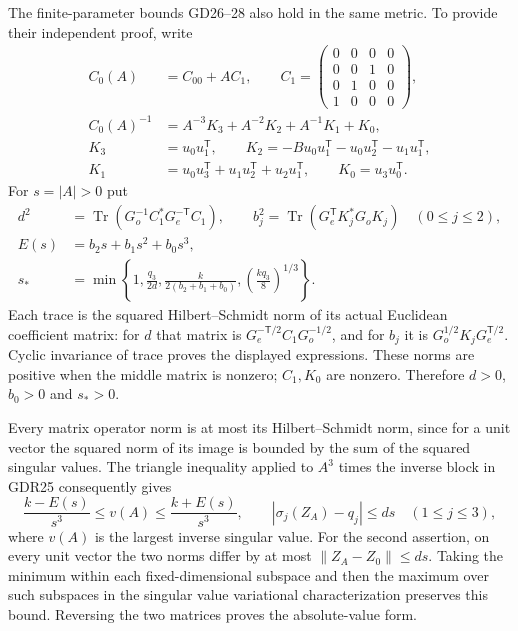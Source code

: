 \documentclass[11pt]{article}
\providecommand{\Tr}{\operatorname{Tr}}
\providecommand{\Tr}{\operatorname{Tr}}
\begin{document}
The finite-parameter bounds GD26--28 also hold in the same
metric. To provide their independent proof, write
\begin{equation}
 \begin{aligned}
 C_0(A)&=C_{00}+AC_1,\qquad
 C_1=\begin{pmatrix}0&0&0&0\\0&0&1&0\\0&1&0&0\\1&0&0&0\end{pmatrix},\\
 C_0(A)^{-1}&=A^{-3}K_3+A^{-2}K_2+A^{-1}K_1+K_0,\\
 K_3&=u_0u_1^{\mathsf T},\qquad
 K_2=-Bu_0u_1^{\mathsf T}-u_0u_2^{\mathsf T}-u_1u_1^{\mathsf T},\\
 K_1&=u_0u_3^{\mathsf T}+u_1u_2^{\mathsf T}+u_2u_1^{\mathsf T},
 \qquad K_0=u_3u_0^{\mathsf T}.
 \end{aligned}
 \tag{GDR28}
\end{equation}
For $s=|A|>0$ put
\begin{equation}
 \begin{aligned}
 d^2&=\Tr(G_o^{-1}C_1^*G_e^{-\mathsf T}C_1),\qquad
 b_j^2=\Tr(G_e^{\mathsf T}K_j^*G_oK_j)\quad(0\le j\le2),\\
 E(s)&=b_2s+b_1s^2+b_0s^3,\\
 s_*&=\min\left\{1,\frac{q_3}{2d},
 \frac{k}{2(b_2+b_1+b_0)},
 \left(\frac{kq_3}{8}\right)^{1/3}\right\}.
 \end{aligned}
 \tag{GDR29}
\end{equation}
Each trace is the squared Hilbert--Schmidt norm of its
actual Euclidean coefficient matrix: for $d$ that matrix
is $G_e^{-\mathsf T/2}C_1G_o^{-1/2}$, and for $b_j$ it
is $G_o^{1/2}K_jG_e^{\mathsf T/2}$. Cyclic invariance of
trace proves the displayed expressions. These norms are
positive when the middle matrix is nonzero; $C_1,K_0$ are
nonzero. Therefore $d>0$, $b_0>0$ and $s_*>0$.

Every matrix operator norm is at most its Hilbert--Schmidt
norm, since for a unit vector the squared norm of its image
is bounded by the sum of the squared singular values.
The triangle inequality applied to $A^3$ times the inverse
block in GDR25 consequently gives
\[
 \frac{k-E(s)}{s^3}\le v(A)\le\frac{k+E(s)}{s^3},
 \qquad |\sigma_j(Z_A)-q_j|\le ds\quad(1\le j\le3),
\]
where $v(A)$ is the largest inverse singular value.
For the second assertion, on every unit vector the two
norms differ by at most $\|Z_A-Z_0\|\le ds$. Taking
the minimum within each fixed-dimensional subspace and
then the maximum over such subspaces in the singular
value variational characterization preserves this bound.
Reversing the two matrices proves the absolute-value form.
\end{document}
